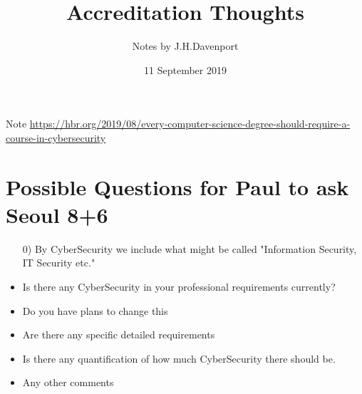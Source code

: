 \documentclass{article}
\begin{document}
\author{Notes by J.H.Davenport}
\title{Accreditation Thoughts}
\date{11 September 2019}
\maketitle
Note \url{https://hbr.org/2019/08/every-computer-science-degree-should-require-a-course-in-cybersecurity}
\section{Possible Questions for Paul to ask Seoul 8+6}
\begin{itemize}
\item[0)]By CyberSecurity we include what might be called "Information Security, IT Security etc."
\item Is there any CyberSecurity in your professional requirements currently?
\item  Do you have plans to change this
\item Are there any specific detailed requirements
\item Is there any quantification of how much CyberSecurity there should be.
\item Any other comments
\end{itemize}

\section{}
\end{document}
